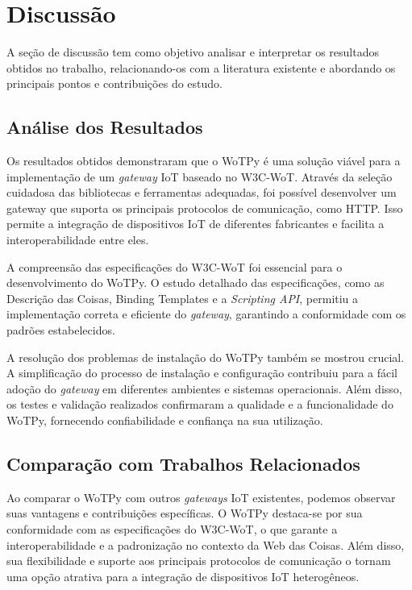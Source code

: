 \chapter{Discussão}

A seção de discussão tem como objetivo analisar e interpretar os resultados obtidos no trabalho, relacionando-os com a literatura existente e abordando os principais pontos e contribuições do estudo.

\section{Análise dos Resultados}

Os resultados obtidos demonstraram que o WoTPy é uma solução viável para a implementação de um \textit{gateway} IoT baseado no W3C-WoT. Através da seleção cuidadosa das bibliotecas e ferramentas adequadas, foi possível desenvolver um gateway que suporta os principais protocolos de comunicação, como HTTP. Isso permite a integração de dispositivos IoT de diferentes fabricantes e facilita a interoperabilidade entre eles.

A compreensão das especificações do W3C-WoT foi essencial para o desenvolvimento do WoTPy. O estudo detalhado das especificações, como as Descrição das Coisas, Binding Templates e a \textit{Scripting API}, permitiu a implementação correta e eficiente do \textit{gateway}, garantindo a conformidade com os padrões estabelecidos.

A resolução dos problemas de instalação do WoTPy também se mostrou crucial. A simplificação do processo de instalação e configuração contribuiu para a fácil adoção do \textit{gateway} em diferentes ambientes e sistemas operacionais. Além disso, os testes e validação realizados confirmaram a qualidade e a funcionalidade do WoTPy, fornecendo confiabilidade e confiança na sua utilização.

\section{Comparação com Trabalhos Relacionados}

Ao comparar o WoTPy com outros \textit{gateways} IoT existentes, podemos observar suas vantagens e contribuições específicas. O WoTPy destaca-se por sua conformidade com as especificações do W3C-WoT, o que garante a interoperabilidade e a padronização no contexto da Web das Coisas. Além disso, sua flexibilidade e suporte aos principais protocolos de comunicação o tornam uma opção atrativa para a integração de dispositivos IoT heterogêneos.

